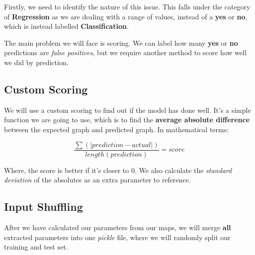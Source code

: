 Firstly, we need to identify the nature of this issue. This falls under the category of \textbf{Regression} as we are dealing with a range of values, instead of a \textbf{yes} or \textbf{no}, which is instead labelled \textbf{Classification}.

The main problem we will face is scoring. We can label how many \textbf{yes} or \textbf{no} predictions are \textit{false positives}, but we require another method to score how well we did by prediction.

\subsection{Custom Scoring}

We will use a custom scoring to find out if the model has done well. It's a simple function we are going to use, which is to find the \textbf{average absolute difference} between the expected graph and predicted graph. In mathematical terms:

$$\frac{\sum \left(|prediction - actual|\right)}{length(prediction)} = score$$

Where, the score is better if it's closer to 0. We also calculate the \textit{standard deviation} of the absolutes as an extra parameter to reference.

\subsection{Input Shuffling}

After we have calculated our parameters from our maps, we will merge \textbf{all} extracted parameters into one \textit{pickle} file, where we will randomly split our training and test set.



